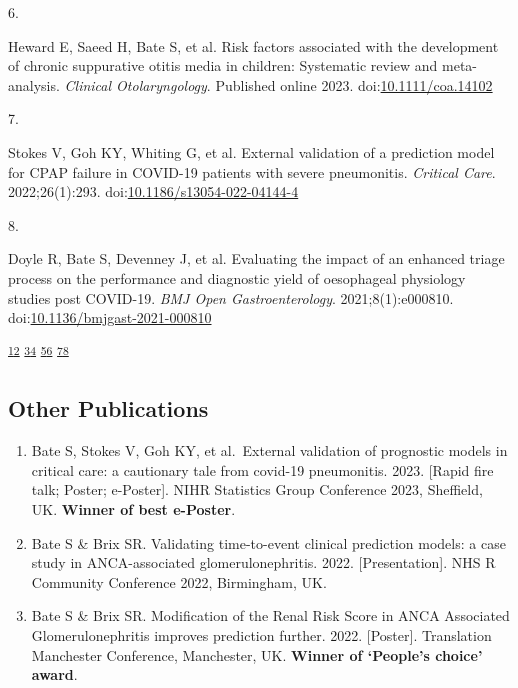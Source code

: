 \documentclass[
]{article}
\providecommand{\tightlist}{%
  \setlength{\itemsep}{0pt}\setlength{\parskip}{0pt}}
\newlength{\cslhangindent}
\newlength{\csllabelwidth}
\newlength{\cslentryspacingunit} %
\newenvironment{CSLReferences}[2] %
 {%
  \setlength{\parindent}{0pt}
  \ifodd #1
  \let\oldpar\par
  \def\par{\hangindent=\cslhangindent\oldpar}
  \fi
  \setlength{\parskip}{#2\cslentryspacingunit}
 }%
 {}
\newcommand{\CSLLeftMargin}[1]{\parbox[t]{\csllabelwidth}{#1}}
\newcommand{\CSLRightInline}[1]{\parbox[t]{\linewidth - \csllabelwidth}{#1}\break}
\begin{document}
\begin{CSLReferences}{0}{0}
\leavevmode{}%
\CSLLeftMargin{6. }%
\CSLRightInline{Heward E, Saeed H, Bate S, et al. Risk factors
associated with the development of chronic suppurative otitis media in
children: Systematic review and meta-analysis. \emph{Clinical
Otolaryngology}. Published online 2023.
doi:\href{https://doi.org/10.1111/coa.14102}{10.1111/coa.14102}}

\leavevmode{}%
\CSLLeftMargin{7. }%
\CSLRightInline{Stokes V, Goh KY, Whiting G, et al. External validation
of a prediction model for CPAP failure in COVID-19 patients with severe
pneumonitis. \emph{Critical Care}. 2022;26(1):293.
doi:\href{https://doi.org/10.1186/s13054-022-04144-4}{10.1186/s13054-022-04144-4}}

\leavevmode{}%
\CSLLeftMargin{8. }%
\CSLRightInline{Doyle R, Bate S, Devenney J, et al. Evaluating the
impact of an enhanced triage process on the performance and diagnostic
yield of oesophageal physiology studies post COVID-19. \emph{BMJ Open
Gastroenterology}. 2021;8(1):e000810.
doi:\href{https://doi.org/10.1136/bmjgast-2021-000810}{10.1136/bmjgast-2021-000810}}

\end{CSLReferences}

\textsuperscript{\protect\hyperlink{ref-Batejrheum}{1}}\textsuperscript{\protect\hyperlink{ref-pla2r}{2}}
\textsuperscript{\protect\hyperlink{ref-gbm}{3}}\textsuperscript{\protect\hyperlink{ref-FI}{4}}
\textsuperscript{\protect\hyperlink{ref-oremule2023mobile}{5}}\textsuperscript{\protect\hyperlink{ref-CSOM}{6}}
\textsuperscript{\protect\hyperlink{ref-cpap}{7}}\textsuperscript{\protect\hyperlink{ref-ETP}{8}}

\hypertarget{other-publications}{%
\subsection{Other Publications}\label{other-publications}}

\begin{enumerate}
\def\labelenumi{\arabic{enumi}.}
\tightlist
\item
  Bate S, Stokes V, Goh KY, et al.~External validation of prognostic
  models in critical care: a cautionary tale from covid-19 pneumonitis.
  2023. {[}Rapid fire talk; Poster; e-Poster{]}. NIHR Statistics Group
  Conference 2023, Sheffield, UK. \textbf{Winner of best e-Poster}.
\item
  Bate S \& Brix SR. Validating time-to-event clinical prediction
  models: a case study in ANCA-associated glomerulonephritis. 2022.
  {[}Presentation{]}. NHS R Community Conference 2022, Birmingham, UK.
\item
  Bate S \& Brix SR. Modification of the Renal Risk Score in ANCA
  Associated Glomerulonephritis improves prediction further. 2022.
  {[}Poster{]}. Translation Manchester Conference, Manchester, UK.
  \textbf{Winner of `People's choice' award}.
\end{enumerate}
\end{document}

